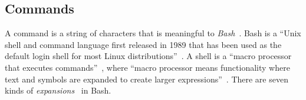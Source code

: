 \subsection{Commands}

A command is a string of characters that is meaningful to \emph{Bash}~\cite{gnu_bash}. Bash is a \enquote{Unix shell and command language first released in 1989 that has been used as the default login shell for most Linux distributions}~\cite{bash}. A shell is a \enquote{macro processor that executes commands}~\cite{bash_manual}, where \enquote{macro processor means functionality where text and symbols are expanded to create larger expressions}~\cite{bash_manual}. There are seven kinds of \emph{expansions}~\cite{bash_expansions_ref} in Bash.